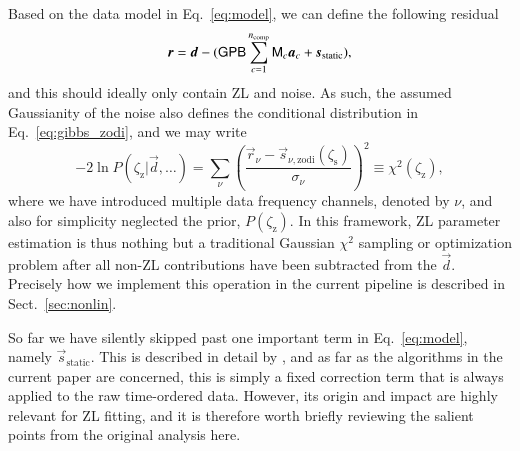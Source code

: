 \documentclass[twocolumn]{aa}
\newcommand{\dv}[0]{\vec{d}}
\newcommand{\B}[0]{\tens{B}}
\renewcommand{\G}[0]{\tens{G}}
\newcommand{\s}[0]{\vec{s}}
\renewcommand{\a}[0]{\vec{a}}
\newcommand{\M}[0]{\tens{M}}
\renewcommand{\r}[0]{\vec{r}}
\renewcommand{\P}[0]{\tens{P}}
\begin{document}
Based on the data model in Eq.~\ref{eq:model}, we can define the
following residual
\begin{equation}
\r = \dv - (\G\P\B\sum_{c=1}^{n_{\mathrm{comp}}}\M_c\a_c +
          \s_{\mathrm{static}}),
\end{equation}
and this should ideally only contain ZL and noise. As such, the
assumed Gaussianity of the noise also defines the conditional
distribution in Eq.~\eqref{eq:gibbs_zodi}, and we may write
\begin{equation}
  -2\ln P(\zeta_{\mathrm{z}}|\dv, \ldots) = \sum_{\nu}
  \left(\frac{\r_{\nu} -
    \s_{\nu,\mathrm{zodi}}(\zeta_\mathrm{s})}{\sigma_{\nu}}\right)^2 \equiv
  \chi^2 (\zeta_{\mathrm{z}}),
  \label{eq:gibbs_chisq}
\end{equation}
where we have introduced multiple data frequency channels, denoted by
$\nu$, and also for simplicity neglected the prior,
$P(\zeta_{\mathrm{z}})$. In this framework, ZL parameter estimation is
thus nothing but a traditional Gaussian $\chi^2$ sampling or
optimization problem after all non-ZL contributions have been
subtracted from the $\dv$. Precisely how we implement this operation
in the current pipeline is described in Sect.~\ref{sec:nonlin}.

So far we have silently skipped past one important term in
Eq.~\eqref{eq:model}, namely $\s_{\mathrm{static}}$. This is described
in detail by \citet{CG02_01}, and as far as the algorithms in the
current paper are concerned, this is simply a fixed correction term
that is always applied to the raw time-ordered data. However, its
origin and impact are highly relevant for ZL fitting, and it is
therefore worth briefly reviewing the salient points from the original
analysis here.
\end{document}
